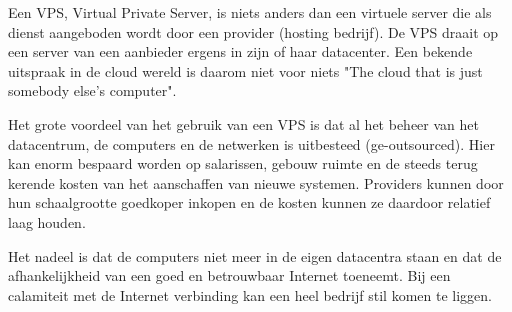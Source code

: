 Een VPS, Virtual Private Server, is niets anders dan een virtuele server die als dienst aangeboden wordt door een provider (hosting bedrijf). De VPS draait op een server van een aanbieder ergens in zijn of haar datacenter. Een bekende uitspraak in de cloud wereld is daarom niet voor niets "The cloud that is just somebody else's computer".

Het grote voordeel van het gebruik van een VPS is dat al het beheer van het datacentrum, de computers en de netwerken is uitbesteed (ge-outsourced). Hier kan enorm bespaard worden op salarissen, gebouw ruimte en de steeds terug kerende kosten van het aanschaffen van nieuwe systemen. Providers kunnen door hun schaalgrootte goedkoper inkopen en de kosten kunnen ze daardoor relatief laag houden.

Het nadeel is dat de computers niet meer in de eigen datacentra staan en dat de afhankelijkheid van een goed en betrouwbaar Internet toeneemt. Bij een calamiteit met de Internet verbinding kan een heel bedrijf stil komen te liggen.
